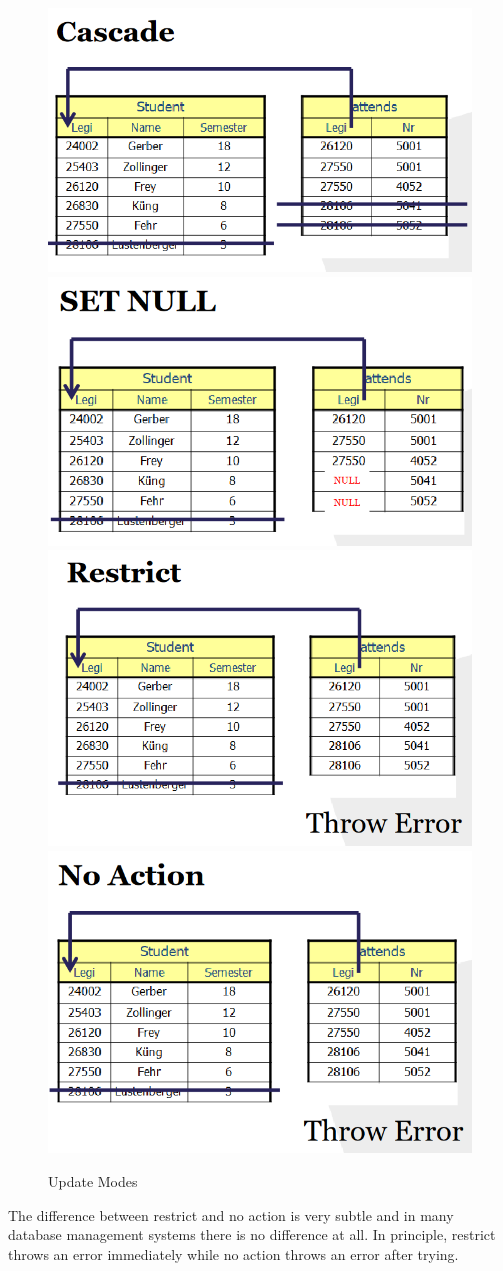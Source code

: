 \begin{figure}[H]
\includegraphics[width=.5\textwidth]{images/cascade.PNG}
\includegraphics[width=.5\textwidth]{images/set-null.PNG}\\
\includegraphics[width=.5\textwidth]{images/restrict.PNG}
\includegraphics[width=.5\textwidth]{images/no-action.PNG}
\caption{Update Modes}
\label{update_modes}
\end{figure}
The difference between restrict and no action is very subtle and in many database management systems there is no difference at all. In principle, restrict throws an error immediately while no action throws an error after trying.

